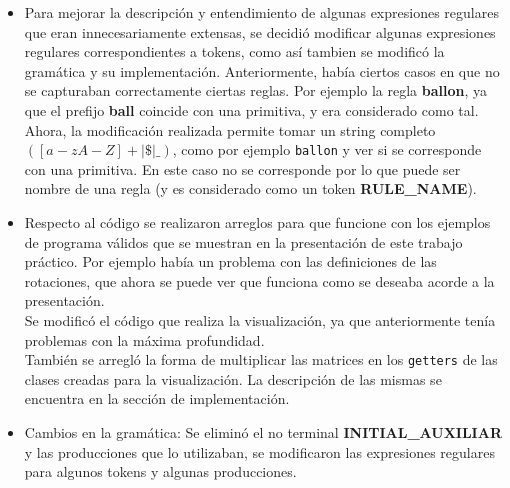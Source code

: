 \begin{itemize}
\item Para mejorar la descripci\'on y entendimiento de algunas expresiones regulares que eran innecesariamente extensas, se decidi\'o modificar algunas expresiones regulares correspondientes a tokens, como así tambien se modificó la gram\'atica y su implementaci\'on. Anteriormente, había ciertos casos en que no se capturaban correctamente ciertas reglas. Por ejemplo la regla \textbf{ballon}, ya que el prefijo \textbf{ball} coincide con una primitiva, y era considerado como tal. \\
Ahora, la modificaci\'on realizada permite tomar un string completo $([a-zA-Z]+|\$|\_)$, como por ejemplo \texttt{ballon} y ver si se corresponde con una primitiva. En este caso no se corresponde por lo que puede ser nombre de una regla (y es considerado como un token \textbf{RULE\_NAME}).

\item Respecto al c\'odigo se realizaron arreglos para que funcione con los ejemplos de programa v\'alidos que se muestran en la presentaci\'on de este trabajo pr\'actico. Por ejemplo hab\'ia un problema con las definiciones de las rotaciones, que ahora se puede ver que funciona como se deseaba acorde a la presentaci\'on.
\\
Se modific\'o el c\'odigo que realiza la visualizaci\'on, ya que anteriormente ten\'ia problemas con la m\'axima profundidad.
\\
Tambi\'en se arregl\'o la forma de multiplicar las matrices en los \texttt{getters} de las clases creadas para la visualizaci\'on. La descripci\'on de las mismas se encuentra en la secci\'on de implementaci\'on.


\item Cambios en la gram\'atica: Se elimin\'o el no terminal \textbf{INITIAL\_AUXILIAR} y las producciones que lo utilizaban, se modificaron las expresiones regulares para algunos tokens y algunas producciones.

\end{itemize}


